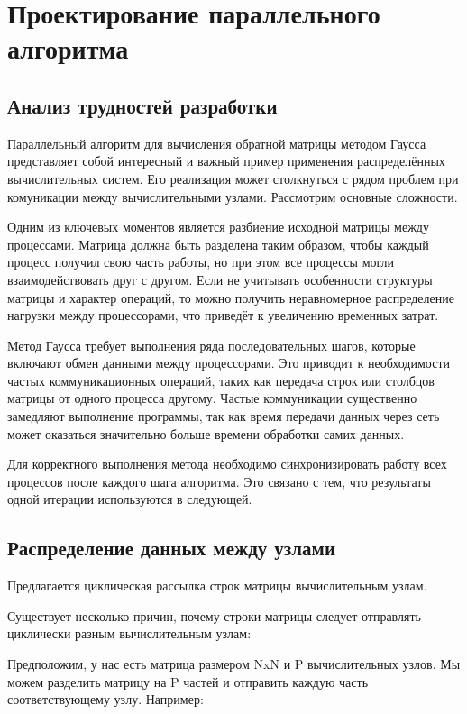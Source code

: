 \section{Проектирование параллельного алгоритма}

\subsection*{Анализ трудностей разработки}

Параллельный алгоритм для вычисления обратной матрицы методом Гаусса представляет собой интересный и важный пример применения распределённых вычислительных систем.
Его реализация может столкнуться с рядом проблем при комуникации между вычислительными узлами.
Рассмотрим основные сложности.

Одним из ключевых моментов является разбиение исходной матрицы между процессами.
Матрица должна быть разделена таким образом, чтобы каждый процесс получил свою часть работы, но при этом все процессы могли взаимодействовать друг с другом.
Если не учитывать особенности структуры матрицы и характер операций, то можно получить неравномерное распределение нагрузки между процессорами, что приведёт к увеличению временных затрат.

Метод Гаусса требует выполнения ряда последовательных шагов, которые включают обмен данными между процессорами.
Это приводит к необходимости частых коммуникационных операций, таких как передача строк или столбцов матрицы от одного процесса другому.
Частые коммуникации существенно замедляют выполнение программы, так как время передачи данных через сеть может оказаться значительно больше времени обработки самих данных.

Для корректного выполнения метода необходимо синхронизировать работу всех процессов после каждого шага алгоритма.
Это связано с тем, что результаты одной итерации используются в следующей.


\subsection*{Распределение данных между узлами}

Предлагается циклическая рассылка строк матрицы вычислительным узлам.


Существует несколько причин, почему строки матрицы следует отправлять циклически разным вычислительным узлам:


Предположим, у нас есть матрица размером NxN и P вычислительных узлов.
Мы можем разделить матрицу на P частей и отправить каждую часть соответствующему узлу. Например:


